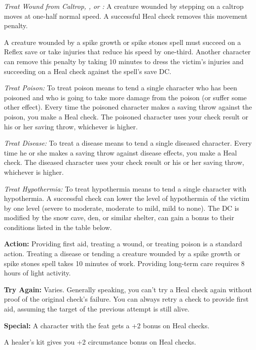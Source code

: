 \textit{Treat Wound from Caltrop, , or :}
A creature wounded by stepping on a caltrop moves at one-half normal speed. A successful Heal check removes this movement penalty.

A creature wounded by a spike growth or spike stones spell must succeed on a Reflex save or take injuries that reduce his speed by one-third. Another character can remove this penalty by taking 10 minutes to dress the victim's injuries and succeeding on a Heal check against the spell's save DC.

\textit{Treat Poison:} To treat poison means to tend a single character who has been poisoned and who is going to take more damage from the poison (or suffer some other effect). Every time the poisoned character makes a saving throw against the poison, you make a Heal check. The poisoned character uses your check result or his or her saving throw, whichever is higher.

\textit{Treat Disease:} To treat a disease means to tend a single diseased character. Every time he or she makes a saving throw against disease effects, you make a Heal check. The diseased character uses your check result or his or her saving throw, whichever is higher.

\textit{Treat Hypothermia:} To treat hypothermia means to tend a single character with hypothermia. A successful check can lower the level of hypothermia of the victim by one level (severe to moderate, moderate to mild, mild to none). The DC is modified by the snow cave, den, or similar shelter, can gain a bonus to their conditions listed in the table below.


\textbf{Action:} Providing first aid, treating a wound, or treating poison is a standard action. Treating a disease or tending a creature wounded by a spike growth or spike stones spell takes 10 minutes of work. Providing long-term care requires 8 hours of light activity.

\textbf{Try Again:} Varies. Generally speaking, you can't try a Heal check again without proof of the original check's failure. You can always retry a check to provide first aid, assuming the target of the previous attempt is still alive.

\textbf{Special:} A character with the  feat gets a +2 bonus on Heal checks.

A healer's kit gives you +2 circumstance bonus on Heal checks.